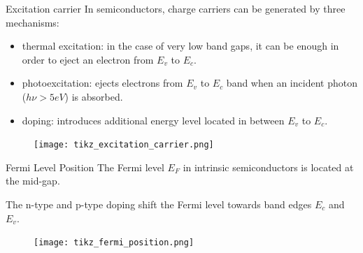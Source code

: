 \documentclass[10pt,compress]{beamer}
\begin{document}
    \begin{frame}{Excitation carrier}
        In semiconductors, charge carriers can be generated by three mechanisms: 
        \begin{itemize}
            \item thermal excitation: in the case of very low band gaps, it can be enough in order 
            to eject an electron from $E_v$ to $E_c$.
            \item photoexcitation: ejects electrons from $E_v$ to $E_c$
            band when an incident photon ($h\nu > 5eV$) is absorbed.
            \item doping: introduces additional energy level located in between $E_v$ to $E_c$.
        \end{itemize}
        
        \begin{figure}[h]
            \centering
            \texttt{[image: tikz\_excitation\_carrier.png]}
            \label{fig_excitation_carrier}
        \end{figure}
    \end{frame}

    \begin{frame}{Fermi Level Position}
        The Fermi level $E_F$ in intrinsic semiconductors is located at the mid-gap. 
        
        The n-type and p-type doping shift the Fermi level towards band edges 
        $E_c$ and $E_v$.
        
        \begin{figure}[H]
            \centering
            \texttt{[image: tikz\_fermi\_position.png]}
            \label{fig_fermi_position}
        \end{figure}
    \end{frame}
\end{document}
